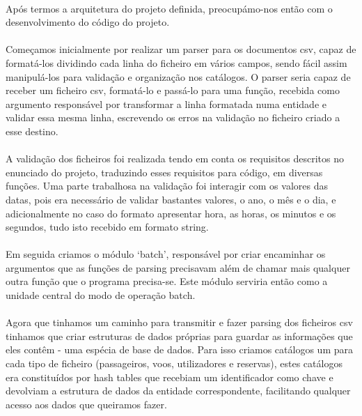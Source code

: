 \documentclass{article}
\begin{document}
\paragraph{}Após termos a arquitetura do projeto definida, preocupámo-nos então com o desenvolvimento do código do projeto. 
\paragraph{}Começamos inicialmente por realizar um parser para os documentos csv, capaz de formatá-los dividindo cada linha do ficheiro em vários campos, sendo fácil assim manipulá-los para validação e organização nos catálogos. O parser seria capaz de receber um ficheiro csv, formatá-lo e passá-lo para uma função, recebida como argumento responsável por transformar a linha formatada numa entidade e validar essa mesma linha, escrevendo os erros na validação no ficheiro criado a esse destino.   
\paragraph{}A validação dos ficheiros foi realizada tendo em conta os requisitos descritos no enunciado do projeto, traduzindo esses requisitos para código, em diversas funções. Uma parte trabalhosa na validação foi interagir com os valores das datas, pois era necessário de validar bastantes valores, o ano, o mês e o dia, e adicionalmente no caso do formato apresentar hora, as horas, os minutos e os segundos, tudo isto recebido em formato string. 
\paragraph{}Em seguida criamos o módulo ‘batch’, responsável por criar encaminhar os argumentos que as funções de parsing precisavam além de chamar mais qualquer outra função que o programa precisa-se. Este módulo serviria então como a unidade central do modo de operação batch.  
\paragraph{}Agora que tinhamos um caminho para transmitir e fazer parsing dos ficheiros csv tinhamos que criar estruturas de dados próprias para guardar as informações que eles contêm - uma espécia de base de dados.  Para isso criamos catálogos um para cada tipo de ficheiro (passageiros, voos, utilizadores e reservas), estes catálogos era constituídos por hash tables que recebiam um identificador como chave e devolviam a estrutura de dados da entidade correspondente, facilitando qualquer acesso aos dados que queiramos fazer. 
\end{document}
